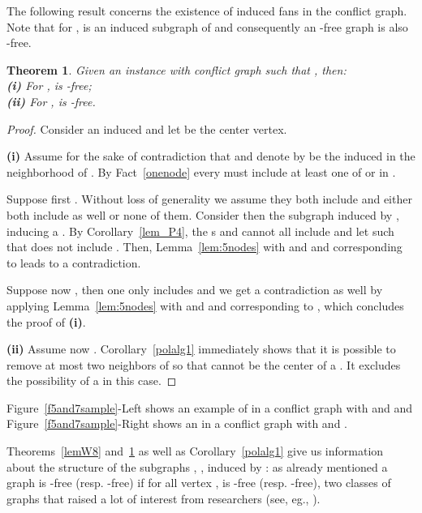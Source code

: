 \documentclass[final]{dmtcs-episciences}
\newtheorem{theorem}{Theorem}
\newcommand\mar[1]{\textcolor{black}{#1}}
\begin{document}
The following result concerns the existence of induced fans  in the conflict graph. Note that for ,  is an induced subgraph of  and consequently an -free graph is also -free. 



\begin{theorem}
\label{Th:F8} 
 Given an instance  with conflict graph  such that , then:\\
\textbf{ (i)}
For ,  is -free;\\
\textbf{ (ii)} For ,  is -free.
\end{theorem}



\begin{proof}
Consider an induced  and let  be the center vertex. 
 
 \textbf{(i)} Assume for the sake of contradiction that  and
 denote by \mar{}
be the induced  in the neighborhood of .
By Fact~\ref{onenode}
every   must include at least one of 
 or  in . 

Suppose first . Without loss of generality we assume they both include  and either both include  as well or none of them. Consider then the subgraph induced by , inducing a .
By Corollary~\ref{lem_P4}, the s  and   cannot all include  and let  such that    does not include . Then, Lemma~\ref{lem:5nodes} with  and  and  corresponding to  leads to a contradiction. 

Suppose now , then one only includes  and we get a contradiction as well by applying Lemma~\ref{lem:5nodes} with  and  and  corresponding to , which concludes the proof of \textbf{ (i)}.

\textbf{(ii)}
Assume now . Corollary~\ref{polalg1} immediately shows that it is possible to remove at most two neighbors of  so that  cannot be the center of a . It excludes the possibility of a  in this case. 
 \end{proof}

Figure~\ref{f5and7sample}-Left shows an example of  in a conflict graph with  and  and Figure~\ref{f5and7sample}-Right shows an  in a conflict graph with  and .
 


Theorems~\ref{lemW8} and~\ref{Th:F8} as well as Corollary~\ref{polalg1}  give us information about the structure of the subgraphs , , induced by  : as already mentioned  a graph  is -free (resp. -free) if for all vertex ,  is -free (resp. -free), two classes of graphs that raised a lot of interest from researchers (see, eg., \citet{isgci,graphclassesbook}). 
\end{document}
